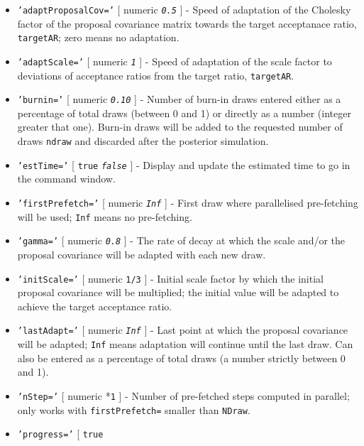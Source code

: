  \begin{itemize}
 \item
   \texttt{'adaptProposalCov='} {[} numeric \textbar{}
   \emph{\texttt{0.5}} {]} - Speed of adaptation of the Cholesky factor
   of the proposal covariance matrix towards the target acceptanace
   ratio, \texttt{targetAR}; zero means no adaptation.
 \item
   \texttt{'adaptScale='} {[} numeric \textbar{} \emph{\texttt{1}} {]} -
   Speed of adaptation of the scale factor to deviations of acceptance
   ratios from the target ratio, \texttt{targetAR}.
 \item
   \texttt{'burnin='} {[} numeric \textbar{} \emph{\texttt{0.10}} {]} -
   Number of burn-in draws entered either as a percentage of total draws
   (between 0 and 1) or directly as a number (integer greater that one).
   Burn-in draws will be added to the requested number of draws
   \texttt{ndraw} and discarded after the posterior simulation.
 \item
   \texttt{'estTime='} {[} \texttt{true} \textbar{} \emph{\texttt{false}}
   {]} - Display and update the estimated time to go in the command
   window.
 \item
   \texttt{'firstPrefetch='} {[} numeric \textbar{} \emph{\texttt{Inf}}
   {]} - First draw where parallelised pre-fetching will be used;
   \texttt{Inf} means no pre-fetching.
 \item
   \texttt{'gamma='} {[} numeric \textbar{} \emph{\texttt{0.8}} {]} - The
   rate of decay at which the scale and/or the proposal covariance will
   be adapted with each new draw.
 \item
   \texttt{'initScale='} {[} numeric \textbar{} \texttt{1/3} {]} -
   Initial scale factor by which the initial proposal covariance will be
   multiplied; the initial value will be adapted to achieve the target
   acceptance ratio.
 \item
   \texttt{'lastAdapt='} {[} numeric \textbar{} \emph{\texttt{Inf}} {]} -
   Last point at which the proposal covariance will be adapted;
   \texttt{Inf} means adaptation will continue until the last draw. Can
   also be entered as a percentage of total draws (a number strictly
   between 0 and 1).
 \item
   \texttt{'nStep='} {[} numeric \textbar{} *\texttt{1} {]} - Number of
   pre-fetched steps computed in parallel; only works with
   \texttt{firstPrefetch=} smaller than \texttt{NDraw}.
 \item
   \texttt{'progress='} {[} \texttt{true} \textbar{}

\end{itemize}
